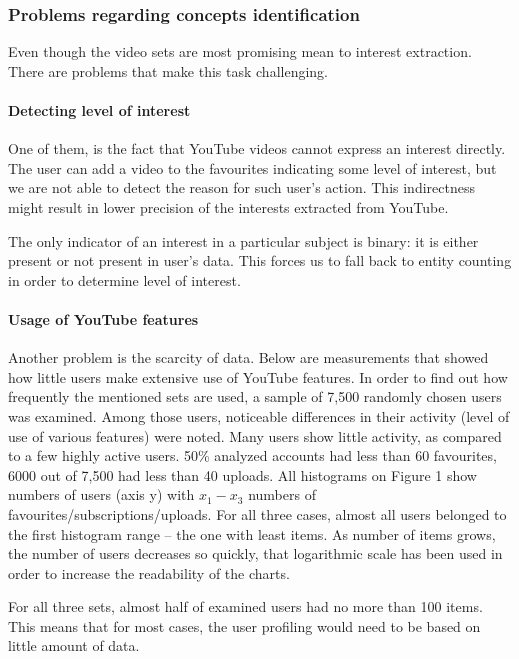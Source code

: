 \subsubsection{Problems regarding concepts identification}

Even though the video sets are most promising mean to interest extraction. There
are problems that make this task challenging.

\paragraph{Detecting level of interest}
One of them, is the fact that YouTube videos cannot
express an interest directly. The user can add a video to the favourites
indicating some level of interest, but we are not able to detect the reason for
such user's action. This indirectness might result in lower precision of the
interests extracted from YouTube. 

The only indicator of an interest in a particular subject is binary: it is
either present or not present in user's data. This forces us to fall back to
entity counting in order to determine level of interest.

\paragraph{Usage of YouTube features} 
Another problem is the scarcity of data. Below are measurements that showed how
little users make extensive use of YouTube features.
In order to find out how frequently the mentioned sets are used, a sample of 7,500
randomly chosen users was examined. Among those users, noticeable differences in their
activity (level of use of various features) were noted. Many users show little activity,
as compared to a few highly active users.  50\% analyzed accounts had less than 60 favourites,
6000 out of 7,500 had less than 40 uploads.  All histograms on Figure 1 show
numbers of users (axis y) with $x_1-x_3$ numbers of
favourites/subscriptions/uploads. For all three cases, almost all users belonged
to the first histogram range -- the one with least items. As number of items
grows, the number of users decreases so quickly, that logarithmic scale has been
used in order to increase the readability of the charts.

For all three sets, almost half of examined users had no more than 100 items.
This means that for most cases, the user profiling would need to be based on
little amount of data.

